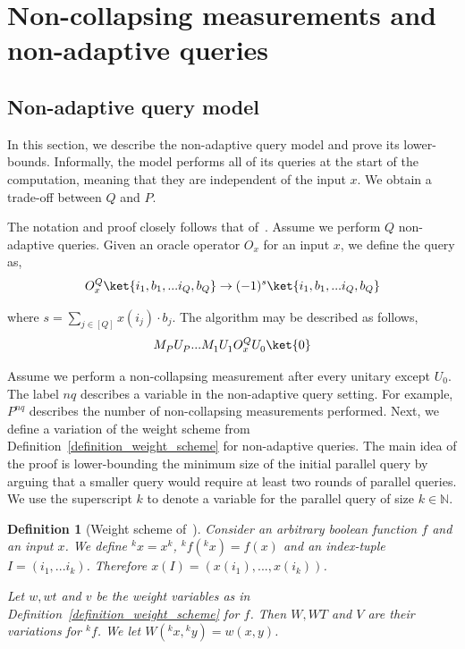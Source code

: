 \documentclass[10pt,a4paper]{article}
\newcommand{\queryamount}[0]{\ensuremath{Q}\xspace}
\newcommand{\abilityamount}[0]{\ensuremath{P}\xspace} %
\newcommand{\nonadaptivelabel}[0]{\ensuremath{nq}\xspace}
\newcommand{\unitarygate}[2][]{\ensuremath{U^{#1}_{#2}}\xspace}
\newcommand{\measurementgate}[2][]{\ensuremath{M^{#1}_{#2}}\xspace}
\newtheorem{definition}[theorem]{Definition}
\begin{document}
\section{Non-collapsing measurements and non-adaptive queries}

\subsection{Non-adaptive query model}\label{subsection_nonadaptive_model}

In this section, we describe the non-adaptive query model and prove its lower-bounds. Informally, the model performs all of its queries at the start of the computation, meaning that they are independent of the input $x$. We obtain a trade-off between \queryamount and \abilityamount.

The notation and proof closely follows that of~\cite{nonadaptive_weighted_adversary}. Assume we perform \queryamount non-adaptive queries. Given an oracle operator $O_x$ for an input $x$, we define the query as,
\begin{align*}
    O_x^{\queryamount} \ket{i_1, b_1, ... i_Q, b_Q} \rightarrow (-1)^{s} \ket{i_1, b_1, ... i_Q, b_Q}
\end{align*}

where $s = \sum_{j\in [Q]} x(i_j)\cdot b_j$. The algorithm may be described as follows,
\begin{align*}
    \measurementgate{\abilityamount}\unitarygate{\abilityamount}... \measurementgate{1}\unitarygate{1}O_x^{\queryamount}\unitarygate{0}\ket{0}
\end{align*}

Assume we perform a non-collapsing measurement after every unitary except $\unitarygate{0}$. The label \nonadaptivelabel describes a variable in the non-adaptive query setting. For example, $\abilityamount^{\nonadaptivelabel}$ describes the number of non-collapsing measurements performed. Next, we define a variation of the weight scheme from Definition~\ref{definition_weight_scheme} for non-adaptive queries. The main idea of the proof is lower-bounding the minimum size of the initial parallel query by arguing that a smaller query would require at least two rounds of parallel queries. We use the superscript $k$ to denote a variable for the parallel query of size $k\in \mathbb{N}$.

\begin{definition}[Weight scheme of~\cite{nonadaptive_weighted_adversary}]\label{definition_nonadaptive}
    Consider an arbitrary boolean function $f$ and an input $x$. We define ${}^k x = x^k$, ${}^k f({}^k x) = f(x)$ and an index-tuple $I = (i_1, ... i_k)$. Therefore $x(I) = (x(i_1),...,x(i_k))$. 
    
    Let $w, wt$ and $v$ be the weight variables as in Definition~\ref{definition_weight_scheme} for $f$. Then $W, WT$ and $V$ are their variations for ${}^k f$. We let $W({}^k x, {}^k y) = w(x,y)$.
\end{definition}
\end{document}
